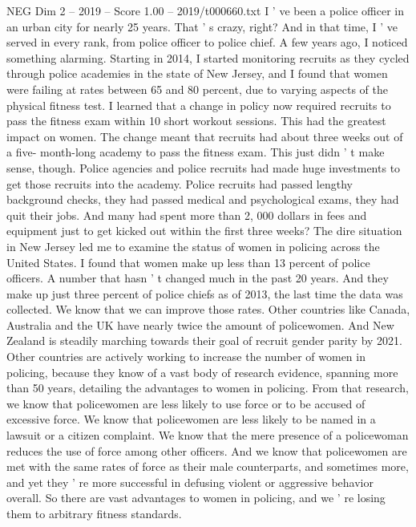 \begin{textsample}{NEG Dim 2 – 2019 – Score 1.00 – 2019/t000660.txt}  \label{ex:f2_neg_061}
I ' ve been a police officer in an urban city for nearly 25 years.
That ' s crazy, right?
And in that time, I ' ve served in every rank, from police officer to police chief.
A few years ago, I noticed something alarming.
Starting in 2014, I started monitoring recruits as they cycled through police academies in the state of New Jersey, and I found that women were failing at rates between 65 and 80 percent, due to varying aspects of the physical fitness test.
I learned that a change in policy now required recruits to pass the fitness exam within 10 short workout sessions.
This had the greatest impact on women.
The change meant that recruits had about three weeks out of a five- month-long academy to pass the fitness exam.
This just didn ' t make sense, though.
Police agencies and police recruits had made huge investments to get those recruits into the academy.
Police recruits had passed lengthy background checks, they had passed medical and psychological exams, they had quit their jobs.
And many had spent more than 2, 000 dollars in fees and equipment just to get kicked out within the first three weeks?
The dire situation in New Jersey led me to examine the status of women in policing across the United States.
I found that women make up less than 13 percent of police officers.
A number that hasn ' t changed much in the past 20 years.
And they make up just three percent of police chiefs as of 2013, the last time the data was collected.
We know that we can improve those rates.
Other countries like Canada, Australia and the UK have nearly twice the amount of policewomen.
And New Zealand is steadily marching towards their goal of recruit gender parity by 2021.
Other countries are actively working to increase the number of women in policing, because they know of a vast body of research evidence, spanning more than 50 years, detailing the advantages to women in policing.
From that research, we know that policewomen are less likely to use force or to be accused of excessive force.
We know that policewomen are less likely to be named in a lawsuit or a citizen complaint.
We know that the mere presence of a policewoman reduces the use of force among other officers.
And we know that policewomen are met with the same rates of force as their male counterparts, and sometimes more, and yet they ' re more successful in defusing violent or aggressive behavior overall.
So there are vast advantages to women in policing, and we ' re losing them to arbitrary fitness standards.

\end{textsample}
